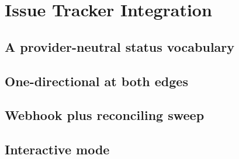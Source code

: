\section{Issue Tracker Integration}
\label{sec:tracker}


\subsection{A provider-neutral status vocabulary}

\subsection{One-directional at both edges}

\subsection{Webhook plus reconciling sweep}

\subsection{Interactive mode}
